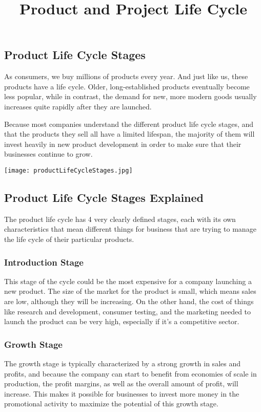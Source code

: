 \documentclass[18 pt]{article}
\begin{document}
\begin{large}

\title{Product and Project Life Cycle}
\author{}
\date{}
\maketitle


\tableofcontents

\leavevmode\thispagestyle{empty}\newpage

\section{Product Life Cycle Stages}	
 As consumers, we buy millions of products every year. And just like us, these products have a life cycle. Older, long-established products eventually become less popular, while in contrast, the demand for new, more modern goods usually increases quite rapidly after they are launched.
 
 
Because most companies understand the different product life cycle stages, and that the products they sell all have a limited lifespan, the majority of them will invest heavily in new product development in order to make sure that their businesses continue to grow.
\begin{center}
\texttt{[image: productLifeCycleStages.jpg]}
\end{center}
\subsection{Product Life Cycle Stages Explained}

The product life cycle has 4 very clearly defined stages, each with its own characteristics that mean different things for business that are trying to manage the life cycle of their particular products.

\subsubsection{Introduction Stage } This stage of the cycle could be the most expensive for a company launching a new product. The size of the market for the product is small, which means sales are low, although they will be increasing. On the other hand, the cost of things like research and development, consumer testing, and the marketing needed to launch the product can be very high, especially if it’s a competitive sector.


\subsubsection{Growth Stage } The growth stage is typically characterized by a strong growth in sales and profits, and because the company can start to benefit from economies of scale in production, the profit margins, as well as the overall amount of profit, will increase. This makes it possible for businesses to invest more money in the promotional activity to maximize the potential of this growth stage.


\end{large}
\end{document}
